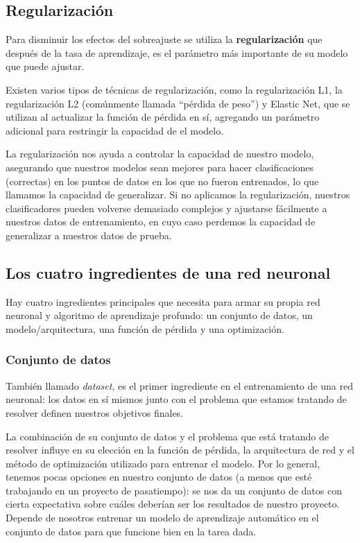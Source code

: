 \documentclass[a4paper,12pt]{article}
\begin{document}
\subsection{Regularización}
Para disminuir los efectos del sobreajuste se utiliza la \textbf{regularización} que después de la tasa de aprendizaje, es el parámetro más importante de su modelo que puede ajustar.

Existen varios tipos de técnicas de regularización, como la regularización L1, la regularización L2 (comúnmente llamada “pérdida de peso”) y Elastic Net, que se utilizan al actualizar la función de pérdida en sí, agregando un parámetro adicional para restringir la capacidad de el modelo.

La regularización nos ayuda a controlar la capacidad de nuestro modelo, asegurando que nuestros modelos sean mejores para hacer clasificaciones (correctas) en los puntos de datos en los que no fueron entrenados, lo que llamamos la capacidad de generalizar. Si no aplicamos la regularización, nuestros clasificadores pueden volverse demasiado complejos y ajustarse fácilmente a nuestros datos de entrenamiento, en cuyo caso perdemos la capacidad de generalizar a nuestros datos de prueba.

\subsection{Los cuatro ingredientes de una red neuronal}
Hay cuatro ingredientes principales \citep{rosebrock2017deep} que necesita para armar su propia red neuronal y algoritmo de aprendizaje profundo: un conjunto de datos, un modelo/arquitectura, una función de pérdida y una optimización.
\subsubsection{Conjunto de datos}
También llamado \textit{dataset}, es el primer ingrediente en el entrenamiento de una red neuronal: los datos en sí mismos junto con el problema que estamos tratando de resolver definen nuestros objetivos finales.

La combinación de su conjunto de datos y el problema que está tratando de resolver influye en su elección en la función de pérdida, la arquitectura de red y el método de optimización utilizado para entrenar el modelo. Por lo general, tenemos pocas opciones en nuestro conjunto de datos (a menos que esté trabajando en un proyecto de pasatiempo): se nos da un conjunto de datos con cierta expectativa sobre cuáles deberían ser los resultados de nuestro proyecto. Depende de nosotros entrenar un modelo de aprendizaje automático en el conjunto de datos para que funcione bien en la tarea dada.
\end{document}
